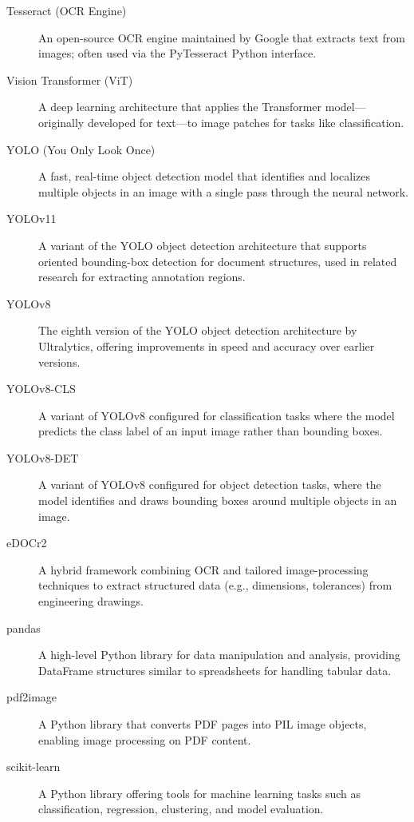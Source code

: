 \documentclass[11pt,a4paper]{article}
\begin{document}
\begin{description}
  \item[Tesseract (OCR Engine)] An open-source OCR engine maintained by Google that extracts text from images; often used via the PyTesseract Python interface.

  \item[Vision Transformer (ViT)] A deep learning architecture that applies the Transformer model—originally developed for text—to image patches for tasks like classification.

  \item[YOLO (You Only Look Once)] A fast, real-time object detection model that identifies and localizes multiple objects in an image with a single pass through the neural network.

  \item[YOLOv11] A variant of the YOLO object detection architecture that supports oriented bounding-box detection for document structures, used in related research for extracting annotation regions.

  \item[YOLOv8] The eighth version of the YOLO object detection architecture by Ultralytics, offering improvements in speed and accuracy over earlier versions.

  \item[YOLOv8-CLS] A variant of YOLOv8 configured for classification tasks where the model predicts the class label of an input image rather than bounding boxes.

  \item[YOLOv8-DET] A variant of YOLOv8 configured for object detection tasks, where the model identifies and draws bounding boxes around multiple objects in an image.

  \item[eDOCr2] A hybrid framework combining OCR and tailored image-processing techniques to extract structured data (e.g., dimensions, tolerances) from engineering drawings.

  \item[pandas] A high-level Python library for data manipulation and analysis, providing DataFrame structures similar to spreadsheets for handling tabular data.

  \item[pdf2image] A Python library that converts PDF pages into PIL image objects, enabling image processing on PDF content.

  \item[scikit-learn] A Python library offering tools for machine learning tasks such as classification, regression, clustering, and model evaluation.

\end{description}
\end{document}
